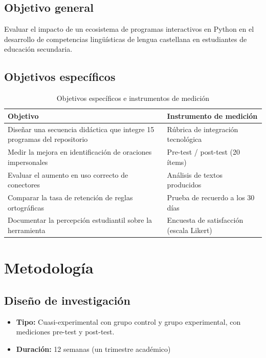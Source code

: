 \documentclass[12pt,spanish]{article}
\begin{document}
\subsection{Objetivo general}

Evaluar el impacto de un ecosistema de programas interactivos en Python en el desarrollo de competencias lingüísticas de lengua castellana en estudiantes de educación secundaria.

\subsection{Objetivos específicos}

\begin{table}[H]
\centering
\caption{Objetivos específicos e instrumentos de medición}
\label{tab:objetivos}
\begin{tabular}{|p{6cm}|p{7cm}|}
\hline
\textbf{Objetivo} & \textbf{Instrumento de medición} \\
\hline
Diseñar una secuencia didáctica que integre 15 programas del repositorio & Rúbrica de integración tecnológica \\
\hline
Medir la mejora en identificación de oraciones impersonales & Pre-test / post-test (20 ítems) \\
\hline
Evaluar el aumento en uso correcto de conectores & Análisis de textos producidos \\
\hline
Comparar la tasa de retención de reglas ortográficas & Prueba de recuerdo a los 30 días \\
\hline
Documentar la percepción estudiantil sobre la herramienta & Encuesta de satisfacción (escala Likert) \\
\hline
\end{tabular}
\end{table}

\newpage
\section{Metodología}

\subsection{Diseño de investigación}

\begin{itemize}
    \item \textbf{Tipo:} Cuasi-experimental con grupo control y grupo experimental, con mediciones pre-test y post-test.
    \item \textbf{Duración:} 12 semanas (un trimestre académico)
\end{itemize}
\end{document}

